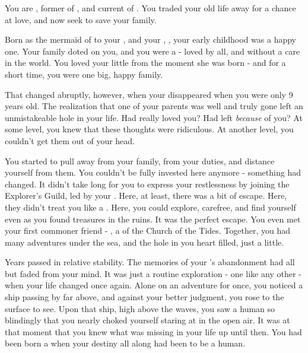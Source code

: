 \documentclass[char]{NeptuneBall}
\begin{document}
\name{\cAriel{}}



You are \cAriel{}, former \cAriel{\Prince} of \pAtlantis{}, and current \cAriel{\King} of \pAmerica{}. You traded your old life away for a chance at love, and now seek to save your family.

Born as the mermaid \cAriel{\prince} of \pAtlantis{} to your \cKing{\parent}, \cKing{\King} \cKing{} and your \cQueen{\parent}, \cQueen{\King} \cQueen{}, your early childhood was a happy one. Your family doted on you, and you were a \cAriel{\prince} - loved by all, and without a care in the world. You loved your little \cPrincess{\sibling} \cPrincess{} from the moment she was born - and for a short time, you were one big, happy family.

That changed abruptly, however, when your \cQueen{\parent} disappeared when you were only 9 years old. The realization that one of your parents was well and truly gone left an unmistakeable hole in your life. Had \cQueen{\they} really loved you? Had \cQueen{\they} left \emph{because} of you? At some level, you knew that these thoughts were ridiculous. At another level, you couldn't get them out of your head.

You started to pull away from your family, from your duties, and distance yourself from them. You couldn't be fully invested here anymore - something had changed. It didn't take long for you to express your restlessness by joining the Explorer's Guild, led by your \cPlant{\Uncle} \cPlant{}. Here, at least, there was a bit of escape. Here, they didn't treat you like a \cAriel{\prince}. Here, you could explore, carefree, and find yourself even as you found treasures in the ruins. It was the perfect escape. You even met your first commoner friend - \cPriest{}, a \cPriest{\priest} of the Church of the Tides. Together, you had many adventures under the sea, and the hole in you heart filled, just a little.

Years passed in relative stability. The memories of your \cQueen{\parent}'s abandonment had all but faded from your mind. It was just a routine exploration - one like any other - when your life changed once again. Alone on an adventure for once, you noticed a ship passing by far above, and against your better judgment, you rose to the surface to see. Upon that ship, high above the waves, you saw a human so blindingly \cEric{\hot} that you nearly choked yourself staring at \cEric{\them} in the open air. It was at that moment that you knew what was missing in your life up until then. You had been born a \cAriel{\mer} when your destiny all along had been to be a human.
\end{document}
